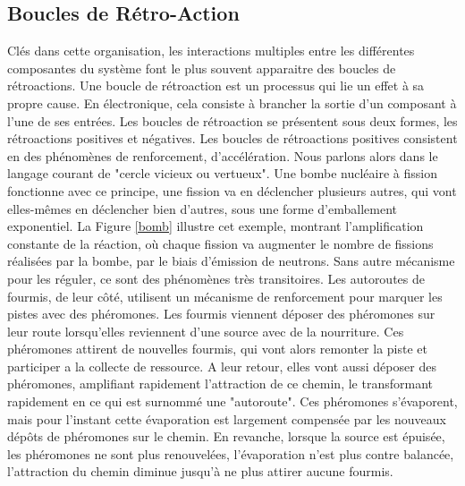 			\subsection{Boucles de Rétro-Action}
		
		Clés dans cette organisation, les interactions multiples entre les différentes composantes du système font le plus souvent apparaitre des boucles de rétroactions. Une boucle de rétroaction est un processus qui lie un effet à sa propre cause. En électronique, cela consiste à brancher la sortie d'un composant à l'une de ses entrées. Les boucles de rétroaction se présentent sous deux formes, les rétroactions positives et négatives. Les boucles de rétroactions positives consistent en des phénomènes de renforcement, d'accélération. Nous parlons alors dans le langage courant de "cercle vicieux ou vertueux". Une bombe nucléaire à fission fonctionne avec ce principe, une fission va en déclencher plusieurs autres, qui vont elles-mêmes en déclencher bien d'autres, sous une forme d'emballement exponentiel. La Figure \ref{bomb} illustre cet exemple, montrant l'amplification constante de la réaction, où chaque fission va augmenter le nombre de fissions réalisées par la bombe, par le biais d'émission de neutrons. Sans autre mécanisme pour les réguler, ce sont des phénomènes très transitoires. Les autoroutes de fourmis, de leur côté, utilisent un mécanisme de renforcement pour marquer les pistes avec des phéromones. Les fourmis viennent déposer des phéromones sur leur route lorsqu'elles reviennent d'une source avec de la nourriture. Ces phéromones attirent de nouvelles fourmis, qui vont alors remonter la piste et participer a la collecte de ressource. A leur retour, elles vont aussi déposer des phéromones, amplifiant rapidement l'attraction de ce chemin, le transformant rapidement en ce qui est surnommé une "autoroute". Ces phéromones s'évaporent, mais pour l'instant cette évaporation est largement compensée par les nouveaux dépôts de phéromones sur le chemin. En revanche, lorsque la source est épuisée, les phéromones ne sont plus renouvelées, l'évaporation n'est plus contre balancée, l'attraction du chemin diminue jusqu'à ne plus attirer aucune fourmis.

